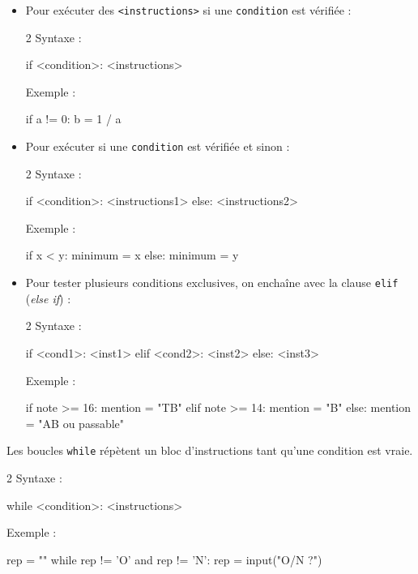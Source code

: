 \documentclass[11pt,a4paper]{article}
\begin{document}
\begin{tcolorbox}[left=0cm,title=\bf{\faPython \; Instructions conditionnelles},colbacktitle=cfond]
	\begin{itemize}
		\item[\textbullet] Pour exécuter des {\tt <instructions>} si une {\tt condition} est vérifiée :
	\setlength{\multicolsep}{0pt}
	\begin{multicols}{2}
	Syntaxe :
	\begin{python} 
if <condition>:
	<instructions>
	\end{python} 
	Exemple : 
	\begin{python} 
if a != 0:
	b = 1 / a
	\end{python} 
\end{multicols}
\item[\textbullet] Pour exécuter {\tt <instructions1>} si une {\tt condition} est vérifiée et {\tt <instructions2>} sinon :
\begin{multicols}{2}
	Syntaxe :
	\begin{python} 
if <condition>:
	<instructions1>
else:
	<instructions2>
	\end{python} 
	Exemple : 
	\begin{python} 
if x < y:
	minimum = x
else:
	minimum = y
	\end{python} 
\end{multicols}
\item[\textbullet] Pour tester plusieurs conditions exclusives, on enchaîne avec la clause \texttt{elif} (\textit{else if}) :
\begin{multicols}{2}
	Syntaxe :
	\begin{python}
if <cond1>:
	<inst1>
elif <cond2>:
	<inst2>
else:
	<inst3>
	\end{python}
	Exemple :
	\begin{python}
if note >= 16:
	mention = "TB"
elif note >= 14:
	mention = "B"
else:
	mention = "AB ou passable"
	\end{python}
\end{multicols}
\end{itemize}
\end{tcolorbox}

\begin{tcolorbox}[left=0cm,title=\bf{\faPython \; Boucles {\tt while}},colbacktitle=cfond]
	Les boucles {\tt while} répètent un bloc d'instructions tant qu'une condition est vraie.
	\setlength{\multicolsep}{0pt}
	\begin{multicols}{2}
		Syntaxe :
		\begin{python} 
while <condition>:
	<instructions>
		\end{python} 
		Exemple : 
		\begin{python}
rep = "" 
while rep != 'O' and rep != 'N':
	rep = input("O/N ?")
		\end{python}
	\end{multicols}
\end{tcolorbox}
\end{document}
